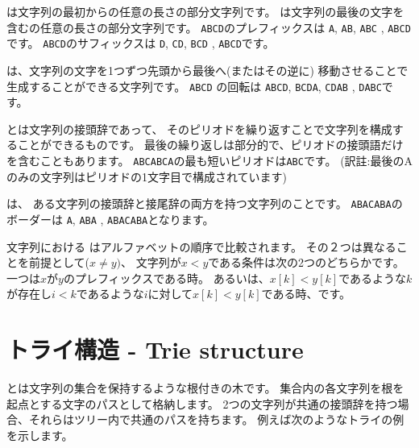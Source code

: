 
は文字列の最初からの任意の長さの部分文字列です。
 は文字列の最後の文字を含むの任意の長さの部分文字列です。
\texttt{ABCD}のプレフィックスは
\texttt{A}, \texttt{AB}, \texttt{ABC} , \texttt{ABCD}です。
\texttt{ABCD}のサフィックスは
\texttt{D}, \texttt{CD}, \texttt{BCD} , \texttt{ABCD}です。


 は、文字列の文字を1つずつ先頭から最後へ(またはその逆に)
移動させることで生成することができる文字列です。
\texttt{ABCD} の回転は
\texttt{ABCD}, \texttt{BCDA}, \texttt{CDAB} , \texttt{DABC}です。


 とは文字列の接頭辞であって、
そのピリオドを繰り返すことで文字列を構成することができるものです。
最後の繰り返しは部分的で、ピリオドの接頭語だけを含むこともあります。
\texttt{ABCABCA}の最も短いピリオドは\texttt{ABC}です。
(訳註:最後のAのみの文字列はピリオドの1文字目で構成されています)


 は、
ある文字列の接頭辞と接尾辞の両方を持つ文字列のことです。
\texttt{ABACABA}のボーダーは
\texttt{A}, \texttt{ABA} , \texttt{ABACABA}となります。


文字列における
はアルファベットの順序で比較されます。
その２つは異なることを前提として($x \neq y)$、
文字列が$x<y$である条件は次の2つのどちらかです。
一つは$x$が$y$のプレフィックスである時。
あるいは、$x[k]<y[k]$であるような$k$が存在し$i<k$であるような$i$に対して$x[k]<y[k]$である時、です。

\section{トライ構造 - Trie structure}


とは文字列の集合を保持するような根付きの木です。
集合内の各文字列を根を起点とする文字のパスとして格納します。
2つの文字列が共通の接頭辞を持つ場合、それらはツリー内で共通のパスを持ちます。
例えば次のようなトライの例を示します。

